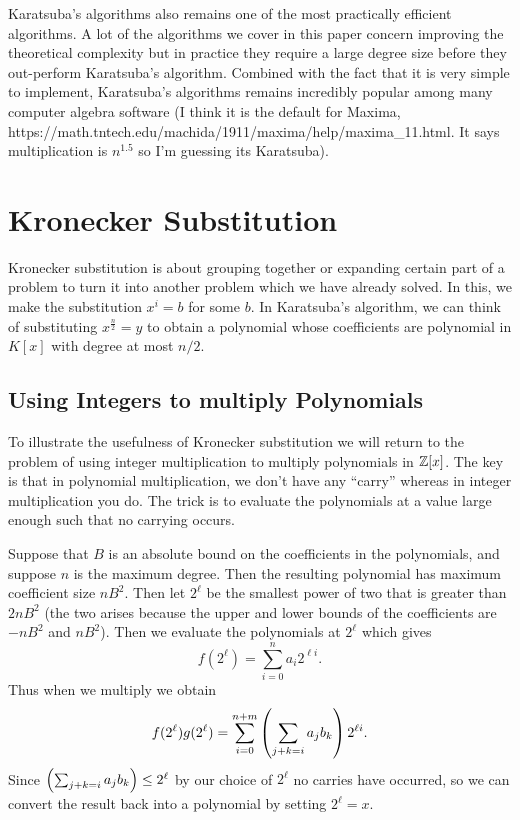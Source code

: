 Karatsuba's algorithms also remains one of the most practically efficient algorithms. A lot of the algorithms we cover in this paper concern improving the theoretical complexity but in practice they require a large degree size before they out-perform Karatsuba's algorithm. Combined with the fact that it is very simple to implement, Karatsuba's algorithms remains incredibly popular among many computer algebra software (I think it is the default for Maxima, https://math.tntech.edu/machida/1911/maxima/help/maxima_11.html. It says multiplication is $n^{1.5}$ so I'm guessing its Karatsuba).


\section{Kronecker Substitution}%
\label{sub:kronecker_substitution}

Kronecker substitution is about grouping together or expanding certain part of a problem to turn it into another problem which we have already solved. In this, we make the substitution $x^i = b$ for some $b$. In Karatsuba's algorithm, we can think of substituting $x^{\frac{n}{2}} = y$ to obtain a polynomial whose coefficients are polynomial in $K[x]$ with degree at most $n/2$.

\subsection{Using Integers to multiply Polynomials}%
\label{sub:Using Integers to multiply Polynomials}

To illustrate the usefulness of Kronecker substitution we will return to the problem of using integer multiplication to multiply polynomials in ${\mathbb Z}[x]$. The key is that in polynomial multiplication, we don't have any ``carry'' whereas in integer multiplication you do. The trick is to evaluate the polynomials at a value large enough such that no carrying occurs.

Suppose that $B$ is an absolute bound on the coefficients in the polynomials, and suppose $n$ is the maximum degree. Then the resulting polynomial has maximum coefficient size $nB^2$. Then let $2^\ell$ be the smallest power of two that is greater than $2nB^2$ (the two arises because the upper and lower bounds of the coefficients are $-nB^2$ and $nB^2$). Then we evaluate the polynomials at $2^\ell$ which gives
\[
    f(2^\ell) = \sum^n_{i = 0} a_i 2^{\ell i}.
\]
Thus when we multiply we obtain
\[
    f(2^\ell)g(2^\ell) = \sum^{n+m}_{i=0} \left(\sum_{j + k = i} a_jb_k\right)2^{\ell i}.
\]
Since $\left(\sum_{j + k = i}a_j b_k\right) \leq 2^{\ell}$ by our choice of $2^\ell$ no carries have occurred, so we can convert the result back into a polynomial by setting $2^\ell = x$.

